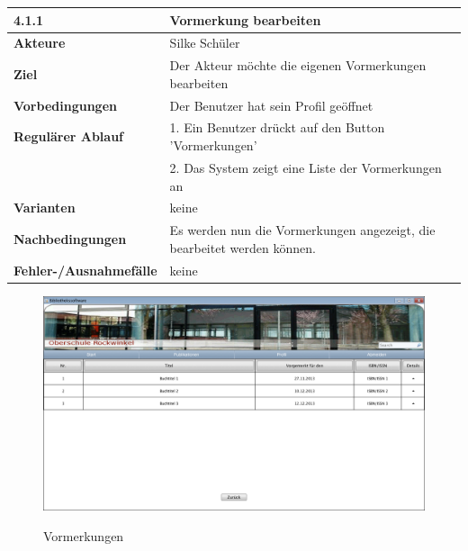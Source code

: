 \documentclass[fontsize=12pt,paper=a4,twoside]{scrartcl}
\begin{document}
\begin{table}[htbp]
\label{4.1.1}
\begin{tabular}{|l|p{10cm}|}
\hline 
\textbf{4.1.1} & \textbf{Vormerkung bearbeiten} \\ \hline
\textbf{Akteure} & Silke Schüler\\ \hline
\textbf{Ziel} & Der Akteur möchte die eigenen Vormerkungen bearbeiten  \\ \hline
\textbf{Vorbedingungen} & Der Benutzer hat sein Profil geöffnet  \\ \hline
\textbf{Regulärer Ablauf} & 
1. Ein Benutzer drückt auf den Button 'Vormerkungen' \\
&2. Das System zeigt eine Liste der Vormerkungen an\\
\hline
\textbf{Varianten} & 
keine \\ \hline
\textbf{Nachbedingungen} & Es werden nun die Vormerkungen angezeigt, die bearbeitet werden können.\\ 
\hline
\textbf{Fehler-/Ausnahmefälle} & keine\\
\hline
\end{tabular}
\end{table}

\begin{figure}[htbp]
\caption{Vormerkungen}
\includegraphics[width=1\textwidth]{ScreensWebsite/VormerkungenSchueler.png}
\label{Vormerkungen}
\end{figure}
\end{document}
